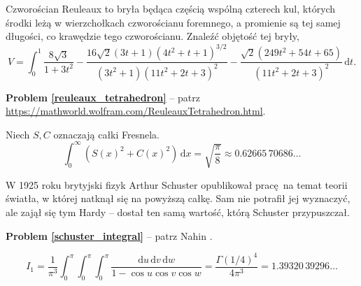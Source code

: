 %

\begin{problem_with_solution}
    \label{reuleaux_tetrahedron}%
    Czworościan Reuleaux to bryła będąca częścią wspólną czterech kul, których środki leżą w wierzchołkach czworościanu foremnego, a promienie są tej samej długości, co krawędzie tego czworościanu.
    Znaleźć objętość tej bryły,
    \begin{equation}
        V = \int_0^1
        \frac{
            8\sqrt{3}
        }{
            1 + 3t^2
        } - \frac{
            16 \sqrt{2} (3t+1) (4t^2 +t+1)^{3/2}
        }{
            (3t^2+1)(11t^2 + 2t + 3)^2
        } - \frac{
            \sqrt{2} (249 t^2 + 54t + 65)
        }{
            (11t^2 + 2t +3)^2
        } \,\mathrm{d} t.
    \end{equation}
\end{problem_with_solution}

\textbf{Problem \ref{reuleaux_tetrahedron}} -- patrz \url{https://mathworld.wolfram.com/ReuleauxTetrahedron.html}.





\begin{problem_with_solution}
    \label{schuster_integral}%
    Niech $S, C$ oznaczają całki Fresnela.
    \begin{equation}
        \int_0^\infty (S(x)^2 + C(x)^2) \,\mathrm{d}x = \sqrt{\frac{\pi}{8}} \approx  0.62665\,70686\ldots
    \end{equation}
\end{problem_with_solution}

W 1925 roku brytyjski fizyk Arthur Schuster opublikował pracę na temat teorii światła, w której natknął się na powyższą całkę.
Sam nie potrafił jej wyznaczyć, ale zajął się tym Hardy -- dostał ten samą wartość, którą Schuster przypuszczał.

\textbf{Problem \ref{schuster_integral}} -- patrz Nahin \cite[s. 201-205]{nahin15}.

\begin{problem_with_solution}
    \label{watson_integrals1}%
    \begin{equation}
        I_1 = \frac{1}{\pi^3} \int_0^\pi\int_0^\pi\int_0^\pi \frac{\mathrm{d}u \, \mathrm{d}v \, \mathrm{d}w}{1 - \cos u \cos v \cos w} = \frac{\Gamma(1/4)^4}{4 \pi^3} = 1.39320\,39296\ldots
    \end{equation}
\end{problem_with_solution}

